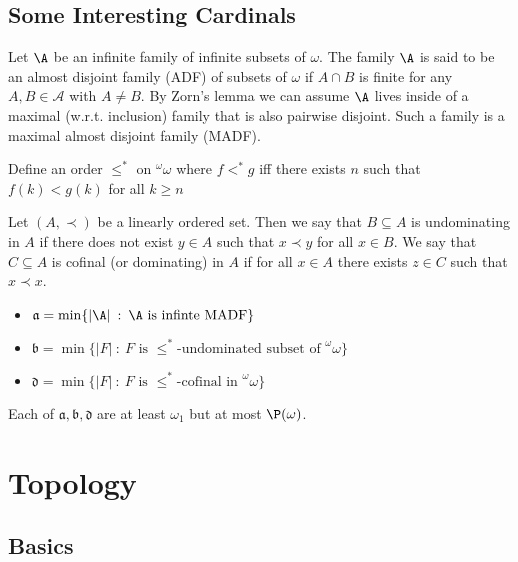\documentclass{article}
\begin{document}
\subsection{Some Interesting Cardinals}

\begin{defn}
    Let \(\A\) be an infinite family of infinite subsets of \(\omega\). The family \(\A\) is said to be an almost disjoint family (ADF) of subsets of \(\omega\) if \(A \cap B \) is finite for any \(A,B \in \mathcal{A}\) with \(A \ne B\). By Zorn's lemma we can assume \(\A\) lives inside of a maximal (w.r.t. inclusion) family that is also pairwise disjoint. Such a family is a maximal almost disjoint family (MADF).
\end{defn}
\begin{defn}
    Define an order \(\leq^{\ast}\) on \(^\omega\omega\) where \(f <^{\ast} g\) iff there exists \(n\) such that \(f(k) < g(k)\) for all \(k \geq n\)
\end{defn}
\begin{defn}
    Let \((A, \prec)\) be a linearly ordered set. Then we say that \(B \subseteq A\) is undominating in \(A\) if there does not exist \(y \in A\) such that \(x \prec y\) for all \(x \in B\). We say that \(C \subseteq A\) is cofinal (or dominating) in \(A\) if for all \(x \in A\) there exists \(z \in C\) such that \(x \prec x\).
\end{defn}

\begin{defn}
    \leavevmode
    \begin{itemize}
        \item \(\mathfrak{a} = \min\{|\A| \: : \: \A \text{ is infinte } \text{MADF}\}\)
        \item \(\mathfrak{b} = \min\{|F| \: : \: F \text{ is } \leq^{\ast}\text{-undominated subset of }^\omega\omega\}\)
        \item \(\mathfrak{d} = \min\{|F| \: : \: F \text{ is } \leq^{\ast}\text{-cofinal in } ^\omega\omega
        \}\)
    \end{itemize}
    Each of \(\mathfrak{a}, \mathfrak{b}, \mathfrak{d}\) are at least \(\omega_1\) but at most \(\P(\omega)\).
\end{defn}


\section{Topology}

\subsection{Basics}
\end{document}
